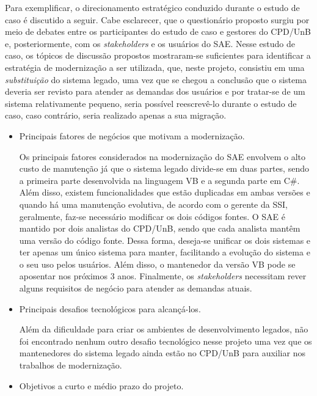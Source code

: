 Para exemplificar, o 
direcionamento estratégico conduzido
durante o estudo de caso
é discutido a seguir.
Cabe esclarecer, que o questionário
proposto surgiu 
por meio de debates entre os participantes
do estudo de caso e gestores do CPD/UnB e, 
posteriormente, com os \textit{stakeholders}
e os usuários do \acrshort{SAE}.
Nesse estudo de caso, 
os tópicos de discussão propostos
mostraram-se suficientes para identificar 
a estratégia de modernização
a ser utilizada, que, neste projeto, consistiu em 
uma \emph{substituição} do sistema legado,
uma vez que se chegou a conclusão que o sistema 
deveria ser revisto para atender as demandas
dos usuários e por tratar-se de um sistema 
relativamente pequeno, seria possível reescrevê-lo 
durante o estudo de caso, caso contrário, seria realizado apenas a sua migração.

\begin{itemize}

\item Principais fatores de negócios que motivam a modernização.

Os principais
fatores considerados na modernização 
do \acrshort{SAE} envolvem
o alto custo de manutenção já que o sistema legado divide-se
em duas partes, sendo a primeira parte 
desenvolvida na linguagem VB e a segunda parte
em C\#. Além disso, existem funcionalidades que
estão duplicadas em ambas versões e 
quando há uma manutenção evolutiva, de acordo 
com o gerente da \acrshort{SSI}, 
geralmente, faz-se necessário modificar os dois códigos fontes. 
O \acrshort{SAE} é mantido por dois analistas do CPD/UnB, 
sendo que cada analista mantêm
uma versão do código fonte. Dessa forma, deseja-se unificar
os dois sistemas e ter apenas um único 
sistema para manter, facilitando a evolução
do sistema e o seu uso pelos usuários. Além disso,
o mantenedor da versão VB pode se aposentar nos próximos 3 anos.
Finalmente, os \textit{stakeholders} necessitam rever 
alguns requisitos de negócio para atender as demandas atuais.

\item Principais desafios tecnológicos para alcançá-los.

Além da dificuldade para criar os ambientes de desenvolvimento legados,
não foi encontrado nenhum outro 
desafio tecnológico nesse projeto uma vez que os mantenedores
do sistema legado ainda estão no CPD/UnB para 
auxiliar nos trabalhos de modernização.

\item Objetivos a curto e médio prazo do projeto.


\end{itemize}
